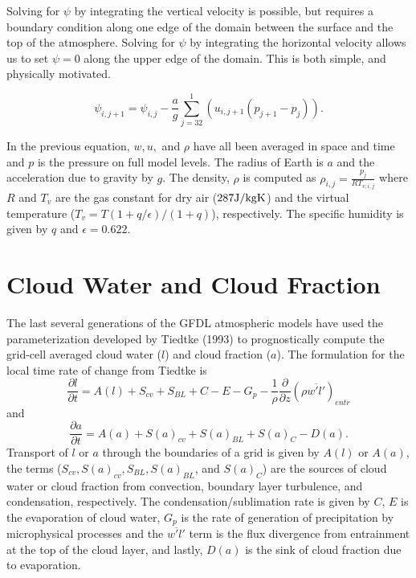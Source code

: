 \documentclass[draft]{agujournal2019}
\begin{document}
Solving for $\psi$ by integrating the vertical velocity is possible, but requires a boundary condition along one edge of the domain between the surface and the 
top of the atmosphere.  Solving for $\psi$ by integrating the horizontal velocity allows us to set $\psi=0$ along the upper edge of the domain.  
This is both simple, and physically motivated.  

\begin{equation}
\psi_{i,j+1}= \psi_{i,j}-\frac{a}{g}\sum_{j=32}^1 \left(u_{i,j+1}(p_{j+1}-p_{j})\right).
\end{equation}

In the previous equation, $w, u,$ and $\rho$ have all been averaged in space and time and $p$ is the pressure on full model levels.  The 
radius of Earth is $a$ and the acceleration due to gravity by $g$.  The density, $\rho$ is computed as $ \rho_{i,j}=\frac{p_j}{R T_{v;i,j}}  $  where $R$ and $T_v$ are the gas constant for dry air ($287 \rm{J/kg K}$) and the virtual temperature ($T_v=T(1+q/\epsilon)/(1+q)$), respectively.  The specific humidity is given by $q$ and $\epsilon = 0.622$.


\section{Cloud Water and Cloud Fraction}

The last several generations of the GFDL atmospheric models have used the parameterization developed by Tiedtke (1993) to prognostically compute the grid-cell averaged cloud water ($l$) and cloud fraction ($a$).  The formulation for the local time rate of change from Tiedtke is 
\begin{equation}
  \frac{\partial l}{\partial t} = A(l)+S_{cv}+S_{BL}+C-E-G_{p}-\frac{1}{\rho}\frac{\partial}{\partial z}(\rho\overline{w'l'})_{entr}
\end{equation}
and 
\begin{equation}
  \frac{\partial a}{\partial t} = A(a)+S(a)_{cv}+S(a)_{BL}+S(a)_C-D(a).
\end{equation}
Transport of $l$ or $a$ through the boundaries of a grid is given by $A(l)$ or $A(a)$, the terms ($S_{cv}, S(a)_{cv}, S_{BL}, S(a)_{BL}$, and $S(a)_C$) are the sources of cloud water or cloud fraction from convection, boundary layer turbulence, and condensation, respectively.  The condensation/sublimation rate is given by $C$, $E$ is the evaporation of cloud water, $G_{p}$ is the rate of generation of precipitation by microphysical processes and the $\overline{w'l'}$ term is the flux divergence from entrainment at the top of the cloud layer, and lastly, $D(a)$ is the sink of cloud fraction due to evaporation.
\end{document}
